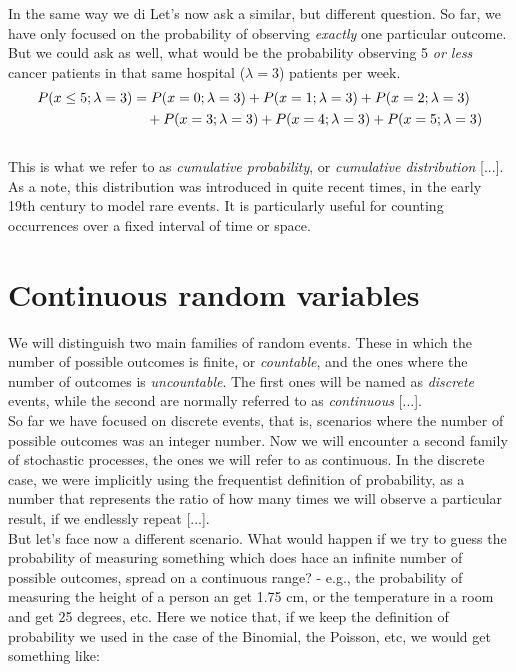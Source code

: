 \documentclass{book}
\begin{document}
In the same way we di Let's now ask a similar, but different question. So far, we have only focused on the probability of observing \textit{exactly} one particular outcome. But we could ask as well, what would be the probability observing 5 \textit{or less} cancer patients in that same hospital ($\lambda = 3$) patients per week.
\begin{align}
    P(x \leq 5; \lambda = 3) &= P(x=0; \lambda = 3) + P(x=1; \lambda = 3) + P(x=2; \lambda = 3) \notag \\
    &\quad + P(x=3; \lambda = 3) + P(x=4; \lambda = 3) + P(x=5; \lambda = 3) \notag
\end{align}\\

This is what we refer to as \textit{cumulative probability}, or \textit{cumulative distribution} [...].\\

As a note, this distribution was introduced in quite recent times, in the early 19th century to model rare events. It is particularly useful for counting occurrences over a fixed interval of time or space.\\

\section{Continuous random variables}

We will distinguish two main families of random events. These in which the number of possible outcomes is finite, or \textit{countable}, and the ones where the number of outcomes is \textit{uncountable}. The first ones will be named as \textit{discrete} events, while the second are normally referred to as \textit{continuous} [...]. \\

So far we have focused on discrete events, that is, scenarios where the number of possible outcomes was an integer number. Now we will encounter a second family of stochastic processes, the ones we will refer to as continuous. In the discrete case, we were implicitly using the frequentist definition of probability, as a number that represents the ratio of how many times we will observe a particular result, if we endlessly repeat [...].\\

But let's face now a different scenario. What would happen if we try to guess the probability of measuring something which does hace an infinite number of possible outcomes, spread on a continuous range? - e.g., the probability of measuring the height of a person an get 1.75 cm, or the temperature in a room and get 25 degrees, etc. Here we notice that, if we keep the definition of probability we used in the case of the Binomial, the Poisson, etc, we would get something like:
\end{document}
